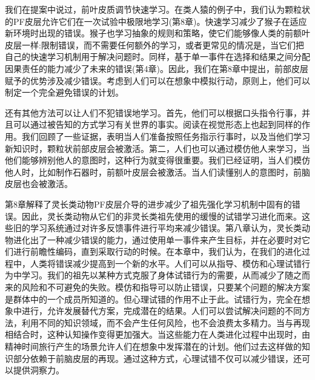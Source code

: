 我们在提案中说过，前叶皮质调节快速学习。在类人猿的例子中，我们认为颗粒状的PF皮层允许它们在一次试验中极限地学习(第8章)。快速学习减少了猴子在适应新环境时出现的错误。猴子也学习抽象的规则和策略，使它们能够像人类的前额叶皮层一样:限制错误，而不需要任何额外的学习，或者更常见的情况是，当它们把自己的快速学习机制用于解决问题时。同样，基于单一事件在选择和结果之间分配因果责任的能力减少了未来的错误(第4章)。因此，我们在第8章中提出，前部皮层赋予的优势涉及减少错误。考虑到人们可以在想象中模拟行动，原则上，他们可以制定一个完全避免错误的计划。

还有其他方法可以让人们不犯错误地学习。首先，他们可以根据口头指令行事，并且可以通过被告知的方式学习有关世界的事实。阅读在视觉形态上也起到同样的作用。我们回顾了一些证据，表明当人们准备按照任务指示行事时，以及当他们学习新知识时，颗粒状前部皮层会被激活。第二，人们也可以通过模仿他人来学习，当他们能够辨别他人的意图时，这种行为就变得很重要。我们已经证明，当人们模仿他人时，比如制作石器时，前额叶皮层会被激活。当人们读懂别人的意图时，前脑皮层也会被激活。

第8章解释了灵长类动物PF皮层介导的进步减少了祖先强化学习机制中固有的错误。因此，灵长类动物从它们的非灵长类祖先使用的缓慢的试错学习进化而来。这些旧的学习系统通过对许多反馈事件进行平均来减少错误。第八章认为，灵长类动物进化出了一种减少错误的能力，通过使用单一事件来产生目标，并在必要时对它们进行前瞻性编码，直到采取行动的时候。在本章中，我们认为，在我们的进化过程中，人类将错误减少提高到一个新的水平。人们可以从指导、模仿和心理试错行为中学习。我们的祖先以某种方式克服了身体试错行为的需要，从而减少了随之而来的风险和不可避免的失败。模仿和指导可以防止错误，只要某个问题的解决方案是群体中的一个成员所知道的。但心理试错的作用不止于此。试错行为，完全在想象中进行，允许发展替代方案，完成潜在的结果。人们可以尝试解决问题的不同方法，利用不同的知识领域，而不会产生任何风险，也不会浪费太多精力。当与再现相结合时，这种认知操作变得更加强大。当这些能力在人类进化过程中出现时，由精神时间旅行产生的场景允许人们在想象中发挥潜在的计划。他们过去这样做的知识部分依赖于前脑皮层的再现。通过这种方式，心理试错不仅可以减少错误，还可以提供洞察力。

